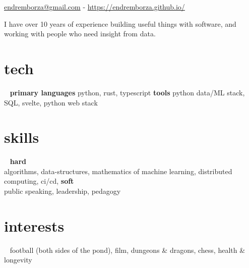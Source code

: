 \documentclass[]{friggeri-cv}
\begin{document}
       {\href{mailto:endremborza@gmail.com}{endremborza@gmail.com} - \href{https://github.com/endremborza/}{https://endremborza.github.io/}}

\vspace{0.6cm}
\begin{flushright}
  I have over 10 years of experience building useful things with software, and working with people who need insight from data.
\end{flushright}
\vspace{0.3cm}
\begin{aside}
  \section{tech}
  ~
   \textbf{primary languages}
   python, rust, typescript
   \textbf{tools}
   python data/ML stack, 
   SQL, 
   svelte, 
   python web stack
  \section{skills}
    ~
    \textbf{hard} \\ algorithms, data-structures, mathematics of machine learning, distributed computing, ci/cd,
    \textbf{soft} \\ public speaking, leadership, pedagogy
  \section{interests}
    ~
    football (both sides of the pond), film, dungeons \& dragons, chess, health \& longevity
\end{aside}
\end{document}

